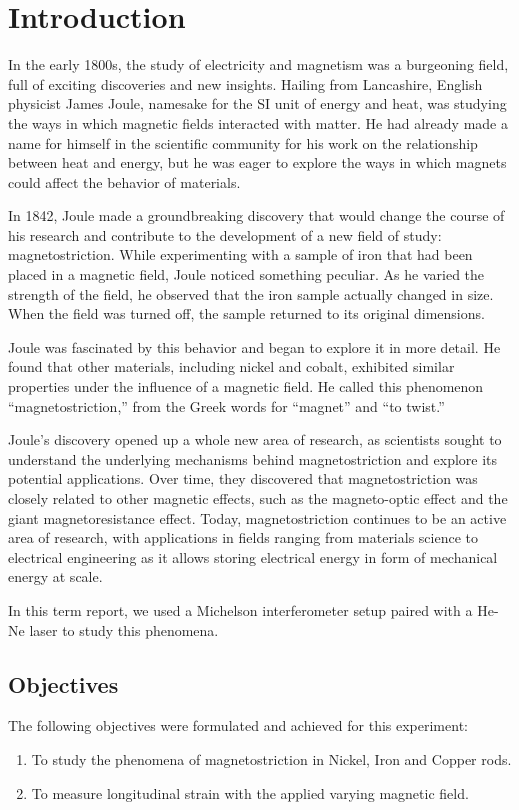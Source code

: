 \chapter{\label{intro}Introduction}

In the early 1800s, the study of electricity and magnetism was a burgeoning field, full of exciting discoveries and new insights. Hailing from Lancashire, English physicist James Joule, namesake for the SI unit of energy and heat, was studying the ways in which magnetic fields interacted with matter. He had already made a name for himself in the scientific community for his work on the relationship between heat and energy, but he was eager to explore the ways in which magnets could affect the behavior of materials.

In 1842, Joule made a groundbreaking discovery that would change the course of his research and contribute to the development of a new field of study: magnetostriction. While experimenting with a sample of iron that had been placed in a magnetic field, Joule noticed something peculiar. As he varied the strength of the field, he observed that the iron sample actually changed in size. When the field was turned off, the sample returned to its original dimensions.

Joule was fascinated by this behavior and began to explore it in more detail. He found that other materials, including nickel and cobalt, exhibited similar properties under the influence of a magnetic field. He called this phenomenon ``magnetostriction,'' from the Greek words for ``magnet'' and ``to twist.''

Joule's discovery opened up a whole new area of research, as scientists sought to understand the underlying mechanisms behind magnetostriction and explore its potential applications. Over time, they discovered that magnetostriction was closely related to other magnetic effects, such as the magneto-optic effect and the giant magnetoresistance effect. Today, magnetostriction continues to be an active area of research, with applications in fields ranging from materials science to electrical engineering as it allows storing electrical energy in form of mechanical energy at scale.

In this term report, we used a Michelson interferometer setup paired with a He-Ne laser to study this phenomena.
\section{Objectives}

The following objectives were formulated and achieved for this experiment:

\begin{enumerate}
	\item  To study the phenomena of magnetostriction in Nickel, Iron and Copper rods.
	\item To measure longitudinal strain with the applied varying magnetic field.
\end{enumerate}


\setcounter{equation}{0}
\setcounter{table}{0}
\setcounter{figure}{0}


    



